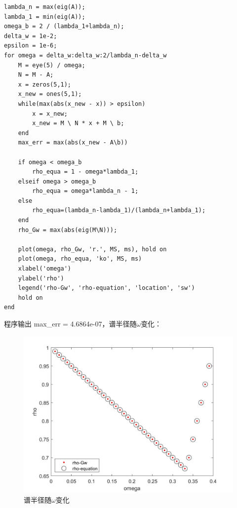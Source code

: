 \documentclass[12pt,a4paper,utf8]{ctexart}
\begin{document}
\begin{enumerate}
\begin{lstlisting}[frame=single]
lambda_n = max(eig(A));
lambda_1 = min(eig(A));
omega_b = 2 / (lambda_1+lambda_n);
delta_w = 1e-2;
epsilon = 1e-6;
for omega = delta_w:delta_w:2/lambda_n-delta_w
    M = eye(5) / omega;
    N = M - A;
    x = zeros(5,1);
    x_new = ones(5,1);
    while(max(abs(x_new - x)) > epsilon)
        x = x_new;
        x_new = M \ N * x + M \ b;
    end
    max_err = max(abs(x_new - A\b))

    if omega < omega_b
        rho_equa = 1 - omega*lambda_1;
    elseif omega > omega_b
        rho_equa = omega*lambda_n - 1;
    else
        rho_equa=(lambda_n-lambda_1)/(lambda_n+lambda_1);
    end
    rho_Gw = max(abs(eig(M\N)));
    
    plot(omega, rho_Gw, 'r.', MS, ms), hold on
    plot(omega, rho_equa, 'ko', MS, ms)
    xlabel('omega')
    ylabel('rho')
    legend('rho-Gw', 'rho-equation', 'location', 'sw')
    hold on
end
\end{lstlisting}

程序输出 max\_err = 4.6864e-07，谱半径随$\omega$变化：

\begin{figure}[H]
    \centering
    \includegraphics[width = .8\textwidth]{2c.jpg}
    \caption{谱半径随$\omega$变化}
\end{figure}



\end{enumerate}
\end{document}
